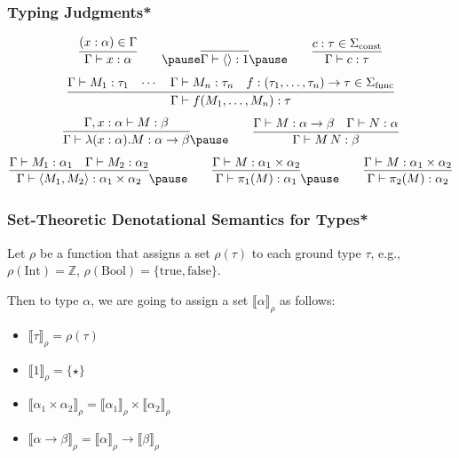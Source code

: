 \documentclass[aspectratio=169]{beamer}
\begin{document}
\begin{frame}
\frametitle{Typing Judgments*}

\pause
\[
\infer{\Gamma \vdash x : \alpha}{(x : \alpha) \in \Gamma}
\qquad
\pause
\infer{\Gamma \vdash \langle \rangle : 1}{}
\pause
\qquad
\infer{\Gamma \vdash c : \tau}{c : \tau \in \Sigma_{\text{const}}}
\]
\pause
\[
\infer{\Gamma \vdash f(M_1, \ldots, M_n) : \tau}{\Gamma \vdash M_1 : \tau_1 & \cdots & \Gamma \vdash M_n : \tau_n & f : (\tau_1, \ldots, \tau_n) \rightarrow \tau \in \Sigma_{\text{func}}}
\]
\pause
\[
\infer{\Gamma \vdash \lambda (x : \alpha). M : \alpha \rightarrow \beta}{\Gamma, x : \alpha \vdash M : \beta}
\pause
\qquad
\infer{\Gamma \vdash M \, N : \beta}{\Gamma \vdash M : \alpha \rightarrow \beta & \Gamma \vdash N : \alpha}
\]
\pause
\[
\infer{\Gamma \vdash \langle M_1, M_2 \rangle : \alpha_1 \times \alpha_2}{\Gamma \vdash M_1 : \alpha_1 & \Gamma \vdash M_2 : \alpha_2}
\pause
\qquad
\infer{\Gamma \vdash \pi_1(M) : \alpha_1}{\Gamma \vdash M : \alpha_1 \times \alpha_2}
\pause
\qquad
\infer{\Gamma \vdash \pi_2(M) : \alpha_2}{\Gamma \vdash M : \alpha_1 \times \alpha_2}
\]
\end{frame}

\begin{frame}
\frametitle{Set-Theoretic Denotational Semantics for Types*}

\pause

Let $\rho$ be a function that assigns a set $\rho(\tau)$ to each ground type $\tau$, e.g., $\rho(\text{Int}) = \mathbb{Z}$, $\rho(\text{Bool}) = \{ \text{true}, \text{false} \}$.

\pause
\medskip

Then to type $\alpha$, we are going to assign a set $\llbracket \alpha \rrbracket_{\rho}$ as follows:
\begin{itemize}
    \pause
    \item $\llbracket \tau \rrbracket_{\rho} = \rho(\tau)$
    \pause
    \item $\llbracket 1 \rrbracket_{\rho} = \{\star\}$
    \pause
    \item $\llbracket \alpha_1 \times \alpha_2 \rrbracket_{\rho} = \llbracket \alpha_1 \rrbracket_{\rho} \times \llbracket \alpha_2 \rrbracket_{\rho}$
    \pause
    \item $\llbracket \alpha \rightarrow \beta \rrbracket_{\rho} = \llbracket \alpha \rrbracket_{\rho} \rightarrow \llbracket \beta \rrbracket_{\rho}$
\end{itemize}
\end{frame}
\end{document}
